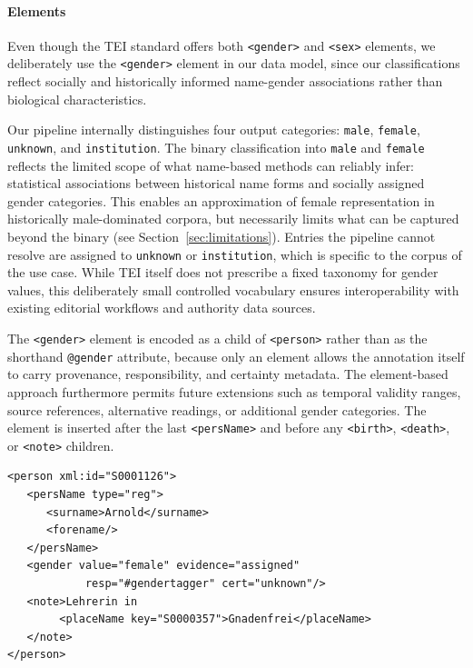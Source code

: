 \documentclass{eceasst}
\begin{document}
\paragraph{Elements} Even though the TEI standard offers both \texttt{<gender>} and \texttt{<sex>} elements, we deliberately use the \texttt{<gender>} element in our data model, since our classifications reflect socially and historically informed name-gender associations rather than biological characteristics.

Our pipeline internally distinguishes four output categories: \texttt{male}, \texttt{female}, \texttt{unknown}, and \texttt{institution}. The binary classification into \texttt{male} and \texttt{female} reflects the limited scope of what name-based methods can reliably infer: statistical associations between historical name forms and socially assigned gender categories. This enables an approximation of female representation in historically male-dominated corpora, but necessarily limits what can be captured beyond the binary (see Section~\ref{sec:limitations}). Entries the pipeline cannot resolve are assigned to \texttt{unknown} or \texttt{institution}, which is specific to the corpus of the use case. While TEI itself does not prescribe a fixed taxonomy for gender values, this deliberately small controlled vocabulary ensures interoperability with existing editorial workflows and authority data sources.

The \texttt{<gender>} element is encoded as a child of \texttt{<person>} rather than as the shorthand \texttt{@gender} attribute, because only an element allows the annotation itself to carry provenance, responsibility, and certainty metadata. The element-based approach furthermore permits future extensions such as temporal validity ranges, source references, alternative readings, or additional gender categories. The element is inserted after the last \texttt{<persName>} and before any \texttt{<birth>}, \texttt{<death>}, or \texttt{<note>} children.

\begin{verbatim}
<person xml:id="S0001126">
   <persName type="reg">
      <surname>Arnold</surname>
      <forename/>
   </persName>
   <gender value="female" evidence="assigned"
            resp="#gendertagger" cert="unknown"/>
   <note>Lehrerin in
        <placeName key="S0000357">Gnadenfrei</placeName>
   </note>
</person>
\end{verbatim}
\end{document}
